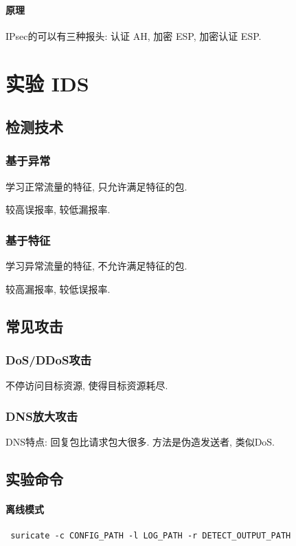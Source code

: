 \documentclass{ctexart}
\begin{document}
\paragraph{原理} IPsec的可以有三种报头: 认证 AH, 加密 ESP, 加密认证 ESP.

\pagebreak \appendix
 
\section{实验 IDS}
\subsection{检测技术}
\subsubsection{基于异常}
    学习正常流量的特征, 只允许满足特征的包.\par
    较高误报率, 较低漏报率.
\subsubsection{基于特征}
    学习异常流量的特征, 不允许满足特征的包.\par
    较高漏报率, 较低误报率.
\subsection{常见攻击}
\subsubsection{DoS/DDoS攻击}
    不停访问目标资源, 使得目标资源耗尽.
\subsubsection{DNS放大攻击}
    DNS特点: 回复包比请求包大很多. 方法是伪造发送者, 类似DoS.
\subsection{实验命令}
\paragraph{离线模式}
\begin{verbatim} suricate -c CONFIG_PATH -l LOG_PATH -r DETECT_OUTPUT_PATH \end{verbatim}
\end{document}
